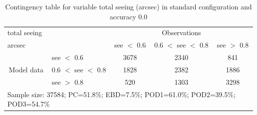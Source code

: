 \begin{table}[]
\begin{center}
\begin{tabular}{llccc}
\hline
{total seeing}                                       &                                                    & \multicolumn{3}{c}{Observations}                 \\
{arcsec}                                       &                             & see $<$ 0.6   & 0.6 $<$ see $<$ 0.8 & see $>$ 0.8 \\
\hline
\multicolumn{1}{c}{\multirow{3}{*}{Model data}}  & see $<$ 0.6             & 3678                & 2340                       & 841              \\
                                                 & 0.6  $<$ see $<$ 0.8 & 1828                & 2382                       & 1886              \\
                                                 & see $>$ 0.8             & 520                & 1303                       & 3298              \\
\hline
\multicolumn{5}{l}{Sample size: 37584; PC=51.8\%; EBD=7.5\%; POD1=61.0\%; POD2=39.5\%; POD3=54.7\%}
\end{tabular}
\end{center}
\caption{Contingency table for variable total seeing (arcsec) in standard configuration and accuracy 0.0}
\label{tab:contingencyseeBEF}
\end{table}
